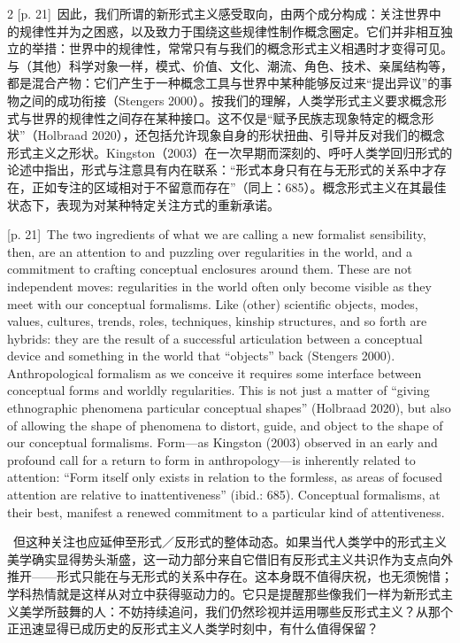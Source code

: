 \documentclass[10pt,a4paper]{article}
\begin{document}
\begin{paracol}{2}
{\scriptsize\color{gray} [p. 21]}\ 因此，我们所谓的新形式主义感受取向，由两个成分构成：关注世界中的规律性并为之困惑，以及致力于围绕这些规律性制作概念圈定。它们并非相互独立的举措：世界中的规律性，常常只有与我们的概念形式主义相遇时才变得可见。与（其他）科学对象一样，模式、价值、文化、潮流、角色、技术、亲属结构等，都是混合产物：它们产生于一种概念工具与世界中某种能够反过来“提出异议”的事物之间的成功衔接（Stengers 2000）。按我们的理解，人类学形式主义要求概念形式与世界的规律性之间存在某种接口。这不仅是“赋予民族志现象特定的概念形状”（Holbraad 2020），还包括允许现象自身的形状扭曲、引导并反对我们的概念形式主义之形状。Kingston（2003）在一次早期而深刻的、呼吁人类学回归形式的论述中指出，形式与注意具有内在联系：“形式本身只有在与无形式的关系中才存在，正如专注的区域相对于不留意而存在”（同上：685）。概念形式主义在其最佳状态下，表现为对某种特定关注方式的重新承诺。\par
\switchcolumn
{\scriptsize\color{gray} [p. 21]}\ The two ingredients of what we are calling a new formalist sensibility, then, are an attention to and puzzling over regularities in the world, and a commitment to crafting conceptual enclosures around them. These are not independent moves: regularities in the world often only become visible as they meet with our conceptual formalisms. Like (other) scientific objects, modes, values, cultures, trends, roles, techniques, kinship structures, and so forth are hybrids: they are the result of a successful articulation between a conceptual device and something in the world that “objects” back (Stengers 2000). Anthropological formalism as we conceive it requires some interface between conceptual forms and worldly regularities. This is not just a matter of “giving ethnographic phenomena particular conceptual shapes” (Holbraad 2020), but also of allowing the shape of phenomena to distort, guide, and object to the shape of our conceptual formalisms. Form—as Kingston (2003) observed in an early and profound call for a return to form in anthropology—is inherently related to attention: “Form itself only exists in relation to the formless, as areas of focused attention are relative to inattentiveness” (ibid.: 685). Conceptual formalisms, at their best, manifest a renewed commitment to a particular kind of attentiveness.\par
\switchcolumn*
{\scriptsize\color{gray} [p. 22]}\ 但这种关注也应延伸至形式／反形式的整体动态。如果当代人类学中的形式主义美学确实显得势头渐盛，这一动力部分来自它借旧有反形式主义共识作为支点向外推开——形式只能在与无形式的关系中存在。这本身既不值得庆祝，也无须惋惜；学科热情就是这样从对立中获得驱动力的。它只是提醒那些像我们一样为新形式主义美学所鼓舞的人：不妨持续追问，我们仍然珍视并运用哪些反形式主义？从那个正迅速显得已成历史的反形式主义人类学时刻中，有什么值得保留？\par

\end{paracol}
\end{document}
